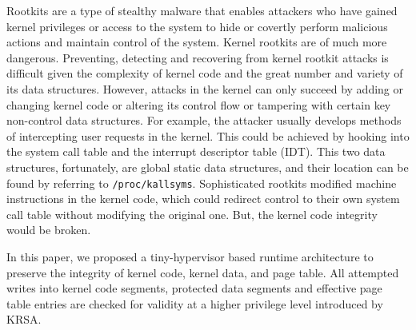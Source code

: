 \documentclass[conference]{IEEEtran}
\begin{document}


Rootkits are a type of stealthy malware that enables attackers who have gained kernel privileges or access to the system to hide or covertly perform malicious actions and maintain control of the system. Kernel rootkits are of much more dangerous. 
Preventing, detecting and recovering from kernel rootkit attacks is difficult given the complexity of kernel code and the great number and variety of its data structures. However, attacks in the kernel can only succeed by adding or changing kernel code or altering its control flow or tampering with certain key non-control data structures. 
For example, the attacker usually develops methods of intercepting user requests in the kernel. This could be achieved by hooking into the system call table and the interrupt descriptor table (IDT). This two data structures, fortunately, are global static data structures, and their location can be found by referring to \verb|/proc/kallsyms|. Sophisticated rootkits modified machine instructions in the kernel code, which could redirect control to their own system call table without modifying the original one. But, the kernel code integrity would be broken. 

In this paper, we proposed a tiny-hypervisor based runtime architecture to preserve the integrity of kernel code, kernel data, and page table. 
All attempted writes into kernel code segments, protected data segments and effective page table entries are checked for validity at a higher privilege level introduced by KRSA.

\end{document}
